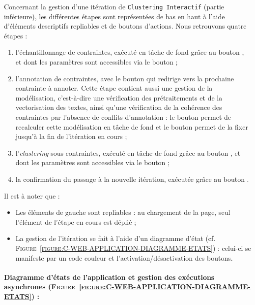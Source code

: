 		Concernant la gestion d'une itération de \texttt{Clustering Interactif} (partie inférieure), les différentes étapes sont représentées de bas en haut à l'aide d'éléments descriptifs repliables et de boutons d'actions.
		Nous retrouvons quatre étapes :
		\begin{enumerate}
			\item l'échantillonnage de contraintes, exécuté en tâche de fond grâce au bouton , et dont les paramètres sont accessibles via le bouton \textguillemets{\faCog} ;
			\item l'annotation de contraintes, avec le bouton  qui redirige vers la prochaine contrainte à annoter.
			Cette étape contient aussi une gestion de la modélisation, c'est-à-dire une vérification des prétraitements et de la vectorisation des textes, ainsi qu'une vérification de la cohérence des contraintes par l'absence de conflits d'annotation : le bouton  permet de recalculer cette modélisation en tâche de fond et le bouton  permet de la fixer jusqu'à la fin de l'itération en cours ;
			\item l'\textit{clustering} sous contraintes, exécuté en tâche de fond grâce au bouton , et dont les paramètres sont accessibles via le bouton \textguillemets{\faCog} ;
			\item la confirmation du passage à la nouvelle itération, exécutée grâce au bouton .
		\end{enumerate}
		
		Il est à noter que :
		\begin{itemize}
			\item Les éléments de gauche sont repliables : au chargement de la page, seul l'élément de l'étape en cours est déplié ;
			\item La gestion de l'itération se fait à l'aide d'un diagramme d'état (cf. \textsc{Figure~\ref{figure:C-WEB-APPLICATION-DIAGRAMME-ETATS}}) : celui-ci se manifeste par un code couleur et l'activation/désactivation des boutons.
		\end{itemize}
	
	
	\newpage
	\paragraph{Diagramme d'états de l'application et gestion des exécutions asynchrones (\textsc{Figure~\ref{figure:C-WEB-APPLICATION-DIAGRAMME-ETATS}}) :}
		
